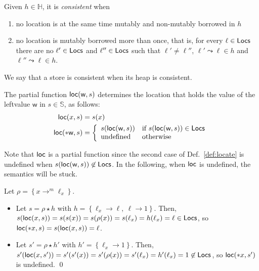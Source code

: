 \begin{definition}
  Given $h\in\mathbb{H}$, it is \emph{consistent} when
  \begin{enumerate}
  \item no location is at the same time mutably and non-mutably borrowed in $h$
  \item no location is mutably borrowed more than once, that is, for every
    $\ell\in\mathsf{Locs}$ there are no $\ell'\in\mathsf{Locs}$ and $\ell''\in\mathsf{Locs}$ such that
    $\ell'\not=\ell''$, $\ell'\leadsto\ell\in h$ and $\ell''\leadsto\ell\in h$.
  \end{enumerate}
  We say that a store is consistent when its heap is consistent.
\end{definition}

\begin{definition}[Locate]\label{def:locate}
  The partial function $\mathsf{loc}(\mathsf{w},s)$ determines the location that holds
  the value of the leftvalue $\mathsf{w}$ in $s\in\mathbb{S}$, as follows:
  \begin{align*}
    \mathsf{loc}(x,s) &= s(x)\\
    \mathsf{loc}(*\mathsf{w},s) &= \left\{\begin{array}{ll}
      s(\mathsf{loc}(\mathsf{w},s)) & \text{if } s(\mathsf{loc}(\mathsf{w},s)) \in \mathsf{Locs}\\
      \text{undefined} & \text{otherwise}
    \end{array}\right.
  \end{align*}
\end{definition}

\noindent
Note that $\mathsf{loc}$ is a partial function since the second case of
Def.~\ref{def:locate} is undefined when
$s(\mathsf{loc}(\mathsf{w},s))\not\in\mathsf{Locs}$. In the following, when $\mathsf{loc}$ is undefined, the
semantics will be stuck.

\begin{example}
  Let $\rho = \left\{x\rightarrow^m\ell_x\right\}$.
  \begin{itemize}
    \item Let $s = \rho\star h$ with
    $h = \left\{\ell_x\rightarrow\ell,\ \ell\rightarrow 1\right\}$.
    Then, $s(\mathsf{loc}(x,s)) = s(s(x)) = s(\rho(x)) = s(\ell_x) =
    h(\ell_x) = \ell\in\mathsf{Locs}$, so
    $\mathsf{loc}(\mathtt{*}x,s)= s(\mathsf{loc}(x,s)) = \ell$.
    \item Let $s' = \rho\star h'$ with
    $h' = \left\{\ell_x\rightarrow 1\right\}$. Then,
    $s'(\mathsf{loc}(x,s')) = s'(s'(x)) = s'(\rho(x)) = s'(\ell_x) =
    h'(\ell_x) = 1 \not\in\mathsf{Locs}$, so $\mathsf{loc}(\mathtt{*}x,s')$ is undefined.
    \qed
  \end{itemize}
\end{example}

